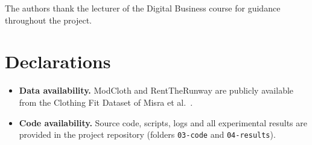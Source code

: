 \documentclass[pdflatex,sn-mathphys-num]{sn-jnl}
\begin{document}
The authors thank the lecturer of the Digital Business course for guidance throughout the project.

\section*{Declarations}
\begin{itemize}
\item \textbf{Data availability.} ModCloth and RentTheRunway are publicly available from the Clothing Fit Dataset of Misra et al.~\cite{misra2018fit}.
\item \textbf{Code availability.} Source code, scripts, logs and all experimental results are provided in the project repository (folders \texttt{03-code} and \texttt{04-results}).
\end{itemize}


\end{document}

